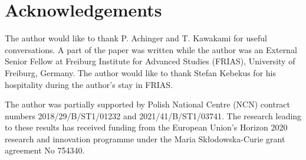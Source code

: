 \documentclass[12pt]{article}
\theoremstyle{plain}
\theoremstyle{definition}
\theoremstyle{remark}
\begin{document}
\section*{Acknowledgements}

The author would like to thank P. Achinger and T. Kawakami for useful conversations.
A part of the paper was written while the author was an External Senior Fellow at Freiburg Institute for Advanced Studies (FRIAS), University of Freiburg, Germany. 
The author would like to thank Stefan Kebekus for his hospitality during the author's stay in FRIAS.

The  author was partially supported by Polish National Centre (NCN) contract numbers 2018/29/B/ST1/01232 and 2021/41/B/ST1/03741. 
The research leading to these results has received funding from the European Union's Horizon 2020 research and innovation programme under the Maria Sk{\l}o\-do\-wska-Curie grant agreement No 754340.
\end{document}
